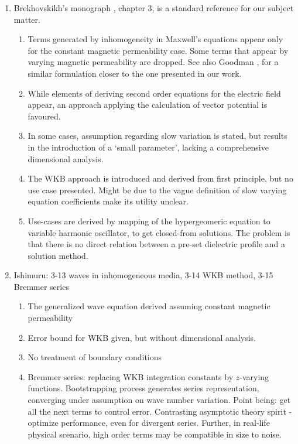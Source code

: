 \documentclass[twocolumn,secnumarabic,amssymb, nobibnotes, aps, prd]{revtex4-1}
\begin{document}
\begin{enumerate}
\item Brekhovskikh's monograph \cite{Brekhovskikh1960}, chapter 3, is a standard reference for our subject matter. 
\begin{enumerate}
\item Terms generated by inhomogeneity in Maxwell's equations appear only for the constant magnetic permeability case. Some terms that appear by varying magnetic permeability are dropped. See also Goodman \cite{goodman2005introduction}, for a similar formulation closer to the one presented in our work. 
\item While elements of deriving second order  equations for the electric field appear, an approach applying the calculation of vector potential is favoured.
\item In some cases, assumption regarding slow variation is stated, but results in the introduction of a `small parameter', lacking a comprehensive dimensional analysis.
\item The WKB approach is introduced and derived from first principle, but no use case presented. Might be due to the vague definition of slow varying equation coefficients make its utility unclear.
\item Use-cases are derived by mapping of the hypergeomeric equation to variable harmonic oscillator, to get closed-from solutions. The problem is that there is no direct relation between a pre-set dielectric profile and a solution method. 
\end{enumerate}
\item Ishimuru: 3-13 waves in inhomogeneous media, 3-14 WKB method, 3-15 Bremmer series
\begin{enumerate}
\item The generalized wave equation derived assuming constant magnetic permeability
\item Error bound for WKB given, but without dimensional analysis.
\item No treatment of boundary conditions 
\item Bremmer series: replacing WKB integration constants by $z$-varying functions. Bootstrapping process generates series  representation, converging under assumption on wave number variation. Point being: get all the next terms to control error. Contrasting asymptotic theory spirit - optimize performance, even for divergent series.  Further, in real-life physical scenario, high order terms may be compatible in size to noise. 
\end{enumerate}

\end{enumerate}
\end{document}
